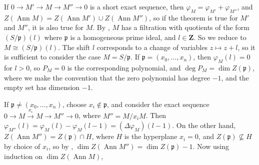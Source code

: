 {\Proof If $0\to M'\to M\to M''\to0$ is a short exact sequence, then $\varphi_M=\varphi_{M'}+\varphi_{M''}$, and $Z(\operatorname{Ann} M)=Z(\operatorname{Ann} M')\cup Z(\operatorname{Ann} M'')$, so if the theorem is true for $M'$ and $M''$, it is also true for $M$. By , $M$ has a filtration with quotients of the form $(S/\mathfrak p)(l)$ where $\mathfrak p$ is a homogeneous prime ideal, and $l\in\mathbf{Z}$. So we reduce to $M\cong(S/\mathfrak p)(l)$. The shift $l$ corresponds to a change of variables $z\mapsto z+l$, so it is sufficient to consider the case $M=S/\mathfrak p$. If $\mathfrak p=(x_0,\ldots,x_n)$, then $\varphi_M(l)=0$ for $l>0$, so $P_M=0$ is the corresponding polynomial, and $\deg P_M=\dim Z(\mathfrak p)$, where we make the convention that the zero polynomial has degree $-1$, and the empty set has dimension $-1$.

If $\mathfrak p\ne(x_0,\ldots,x_n)$, choose $x_i\notin\mathfrak p$, and consider the exact sequence $0\to M\xrightarrow{x_i}M\to M''\to0$, where $M''=M/x_iM$. Then $\varphi_{M''}(l)=\varphi_M(l)-\varphi_M(l-1)=(\Delta\varphi_M)(l-1)$. On the other hand, $Z(\operatorname{Ann} M'')=Z(\mathfrak p)\cap H$, where $H$ is the hyperplane $x_i=0$, and $Z(\mathfrak p)\not\subseteq H$ by choice of $x_i$, so by , $\dim Z(\operatorname{Ann} M'')=\dim Z(\mathfrak p)-1$. Now using induction on $\dim Z(\operatorname{Ann} M)$,
}
